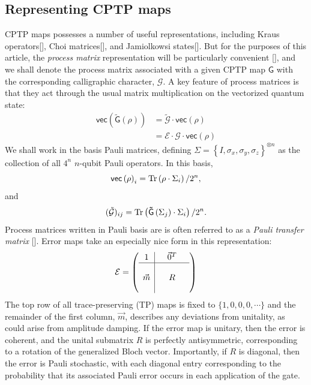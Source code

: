 \documentclass[aps,nofootinbib,pra,notitlepage,twocolumn]{revtex4-1}
\newcommand{\tr}{{\rm Tr\thinspace}}
\newcommand{\vectorize}[1]{\ensuremath{\mathsf{vec}\left(#1\right)}}
\begin{document}
\subsection{Representing CPTP maps}
\noindent CPTP maps possesses a number of useful representations, including Kraus operators[], Choi matrices[], and Jamiolkowsi states[]. But for the purposes of this article, the \emph{process matrix} representation will be particularly convenient [], and we shall denote the process matrix associated with a given CPTP map $\mathsf{G}$ with the corresponding calligraphic character, $\mathcal{G}$. A key feature of process matrices is that they act through the usual matrix multiplication on the vectorized quantum state:
\begin{align}
	\vectorize{\mathsf{\tilde G}(\rho)}
		&= \mathcal{\tilde G}\cdot\vectorize{\rho} \\
		&= \mathcal{E}\cdot\mathcal{G}\cdot\vectorize{\rho}
\end{align}
We shall work in the basis Pauli matrices, defining $\Sigma = \left\{I, \sigma_x, \sigma_y, \sigma_z\right\}^{\otimes n}$ as the collection of all $4^n$ $n$-qubit Pauli operators.  In this basis,
\begin{equation}
  \vectorize{\rho}_i = \tr\!\left(\rho \cdot\Sigma_i\right)/2^n,
\end{equation}
and
\begin{equation}
	(\mathcal{\tilde G})_{ij} = \tr\!\left(\mathsf{\tilde G}\left(\Sigma_j\right) \cdot\Sigma_i\right)/2^n.
\end{equation}
Process matrices written in Pauli basis are is often referred to as a \emph{Pauli transfer matrix} []. Error maps take an especially nice form in this representation:
\begin{equation}\label{eq:process_matrix}
\mathcal{E} =
	\left(\begin{array}{c|cccc}
		1 &  & \vec{0}^T & \\ 
		\hline & &  &  \\
		\vec{m} &  & R &  \\
		 &  &  & 
	\end{array} 	
	\right)
\end{equation}
The top row of all trace-preserving (TP) maps is fixed to $\{1,0,0,0,\cdots\}$ and the remainder of the first column, $\vec{m}$, describes any deviations from unitality, as could arise from amplitude damping. If the error map is unitary, then the error is coherent, and the unital submatrix $R$ is perfectly antisymmetric, corresponding to a rotation of the generalized Bloch vector. Importantly, if $R$ is diagonal, then the error  is Pauli stochastic, with each diagonal entry corresponding to the probability that its associated Pauli error occurs in each application of the gate. 
\end{document}
